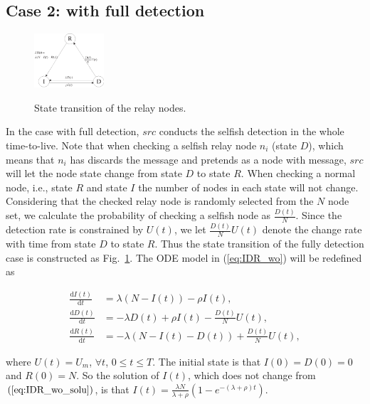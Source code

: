 \subsection{Case 2: with full detection}
\label{subsec:full_detc}
\begin{figure}
  \centering
  {\includegraphics[width=0.23\textwidth]
  {fig/state_transition_detect.eps}}
     \caption{State transition of the relay nodes.}
     \label{fig:ss_dt}
\end{figure}
In the case with full detection,
$src$ conducts the selfish detection in the whole time-to-live.
Note that when checking a selfish relay node $n_{i}$ (state $D$),
which means that $n_{i}$ has discards the message and pretends as a node with message,
$src$ will let the node state change from state $D$ to state $R$.
When checking a normal node, i.e., state $R$ and state $I$
the number of nodes in each state will not change.
Considering that the checked relay node is randomly selected from the $N$ node set,
we calculate the probability of checking a selfish node as $\frac{D(t)}{N}$.
Since the detection rate is constrained by $U(t)$,
we let $\frac{D(t)}{N}U(t)$
denote the change rate with time from state $D$ to state $R$.
Thus the state transition of the fully detection case is constructed as Fig.~\ref{fig:ss_dt}.
The ODE model in (\ref{eq:IDR_wo}) will be redefined as
\begin{small}
\begin{equation}
\label{eq:IDR_full}
\begin{aligned}
\frac{\mathrm{d} I(t)}{\mathrm{d} t} &=  \lambda (N-I(t)) - \rho I(t),\\
\frac{\mathrm{d} D(t)}{\mathrm{d} t} &= - \lambda D(t) + \rho I(t) - \frac{D(t)}{N} U(t),\\
\frac{\mathrm{d} R(t)}{\mathrm{d} t} &= - \lambda (N-I(t)-D(t)) + \frac{D(t)}{N} U(t),
\end{aligned}
\end{equation}
\end{small}
where $U(t) = U_{m}$, $\forall t$, $0 \le t \le T$.
The initial state is that $I(0)=D(0)=0$ and $R(0)=N$.
So the solution of $I(t)$, which does not change from $(\ref{eq:IDR_wo_solu})$,
is that $I(t) = \frac{ \lambda N }{ \lambda + \rho }(1- e^{-(\lambda + \rho)t})$.
